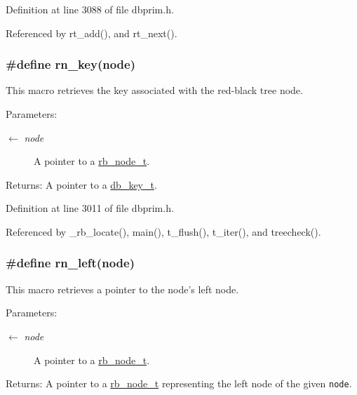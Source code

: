 Definition at line 3088 of file dbprim.h.

Referenced by rt\_\-add(), and rt\_\-next().\hypertarget{group__dbprim__rbtree_ga37}{
\subsubsection[rn\_\-key]{\setlength{\rightskip}{0pt plus 5cm}\#define rn\_\-key(node)}}
\label{group__dbprim__rbtree_ga37}


This macro retrieves the key associated with the red-black tree node.

\begin{Desc}
\item[Parameters:]
\begin{description}
\item[\mbox{$\leftarrow$} {\em node}]A pointer to a \hyperlink{group__dbprim__rbtree_ga1}{rb\_\-node\_\-t}.\end{description}
\end{Desc}
\begin{Desc}
\item[Returns:]A pointer to a \hyperlink{group__dbprim_ga0}{db\_\-key\_\-t}.\end{Desc}


Definition at line 3011 of file dbprim.h.

Referenced by \_\-rb\_\-locate(), main(), t\_\-flush(), t\_\-iter(), and treecheck().\hypertarget{group__dbprim__rbtree_ga35}{
\subsubsection[rn\_\-left]{\setlength{\rightskip}{0pt plus 5cm}\#define rn\_\-left(node)}}
\label{group__dbprim__rbtree_ga35}


This macro retrieves a pointer to the node's left node.

\begin{Desc}
\item[Parameters:]
\begin{description}
\item[\mbox{$\leftarrow$} {\em node}]A pointer to a \hyperlink{group__dbprim__rbtree_ga1}{rb\_\-node\_\-t}.\end{description}
\end{Desc}
\begin{Desc}
\item[Returns:]A pointer to a \hyperlink{group__dbprim__rbtree_ga1}{rb\_\-node\_\-t} representing the left node of the given {\tt node}.\end{Desc}


